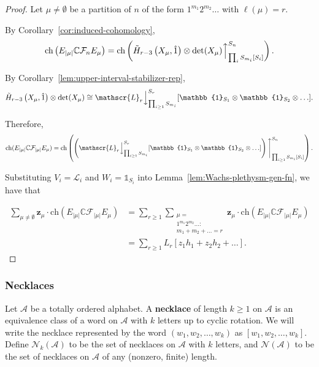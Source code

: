 \documentclass[ALCO, Unicode]{cedram}
\def\ch{\mathrm{ch}}
\def\C{{\mathbb{C}}}
\def\ch{\mathrm{ch}}
\begin{document}
\begin{proof}
Let $\mu \neq \emptyset$ be a partition of $n$ of the form $1^{m_1}2^{m_2}\ldots$ with $ \ell(\mu) = r.$ 

By Corollary~\ref{cor:induced-cohomology}, \[\ch \left(E_{|\mu|}\C \mathcal{F}_nE_\mu\right) = \ch \left(\Tilde{H}_{r - 3}\left(X_\mu, \hat{1}\right) \otimes \det(X_\mu) \Big \uparrow_{\prod_i S_{m_i}[S_i]}^{S_{n}} \right).\]

By Corollary~\ref{lem:upper-interval-stabilizer-rep}, 
    \begin{align*}
        \Tilde{H}_{r - 3}\left(X_\mu, \hat{1}\right) \otimes \det(X_\mu) \cong \mathscr{L}_r \Big \downarrow^{S_r}_{\prod_{i \geq 1} S_{m_i}}[\mathbb{1}_{S_1} \otimes \mathbb{1}_{S_2} \otimes \ldots].
    \end{align*}

    Therefore,
    \[\ch(E_{|\mu|}\C \mathcal{F}_{|\mu|} E_\mu) = \ch \left( \left(\mathscr{L}_r \Big \downarrow_{\prod_{i \geq 1} S_{m_i}}^{S_r}[\mathbb{1}_{S_1} \otimes \mathbb{1}_{S_2}\otimes \ldots ]\right)\Bigg \uparrow_{\prod_{i\geq 1}S_{m_i}[S_i]}^{S_n}\right).\]
    
   Substituting $V_i = \mathscr{L}_i$ and $W_i = \mathbb{1}_{S_i}$ into  Lemma~\ref{lem:Wachs-plethysm-gen-fn}, we have that

   \begin{align*}
       \sum_{\mu \neq \emptyset }\mathbf{z}_\mu \cdot \ch \left(E_{|\mu|}\C \mathcal{F}_{|\mu|}E_\mu\right) &= \sum_{r\geq 1}\sum_{\substack{\mu = \\1^{m_1} 2^{m_2} \ldots:\\ m_1 + m_2 + \ldots = r}}\mathbf{z}_\mu \cdot \ch \left(E_{|\mu|}\C \mathcal{F}_{|\mu|}E_{\mu}\right)\\
       &= \sum_{r \geq 1} L_{r}[z_1 h_1 + z_2 h_2 + \ldots ].
   \end{align*}
    \end{proof}


\subsubsection{Necklaces} \label{sec:necklace}

Let $\mathscr{A}$ be a totally ordered alphabet. A \textbf{necklace} of length $k \geq 1$ on $\mathscr{A}$ is an equivalence class of a word on $\mathscr{A}$ with $k$ letters up to cyclic rotation. We will write the necklace represented by the word $(w_1, w_2, \ldots, w_k)$ as \textbf{$[w_1, w_2, \ldots, w_k].$} Define \textbf{$\mathscr{N}_k(\mathscr{A})$} to be the set of necklaces on  $\mathscr{A}$ with $k$ letters, and \textbf{$\mathscr{N}(\mathscr{A})$} to be the set of necklaces on $\mathscr{A}$ of any (nonzero, finite) length. 
\end{document}
